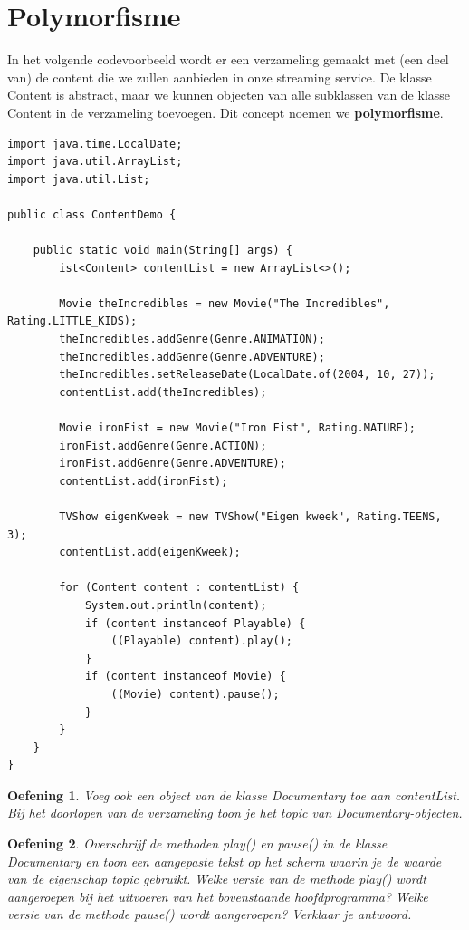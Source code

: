 \documentclass{tstextbook}
\newtheorem{envoefening}{Oefening}[chapter]
\newenvironment{oefening}
               {\begin{boxexercise}\begin{envoefening}}
               {\end{envoefening}\end{boxexercise}}
\begin{document}
\section{Polymorfisme}

In het volgende codevoorbeeld wordt er een verzameling gemaakt met (een deel van) de content die we zullen aanbieden in onze streaming service. De klasse Content is abstract, maar we kunnen objecten van alle subklassen van de klasse Content in de verzameling toevoegen. Dit concept noemen we \textbf{polymorfisme}. 


\begin{lstlisting}
import java.time.LocalDate;
import java.util.ArrayList;
import java.util.List;

public class ContentDemo {

	public static void main(String[] args) {
		ist<Content> contentList = new ArrayList<>();

		Movie theIncredibles = new Movie("The Incredibles", Rating.LITTLE_KIDS);
		theIncredibles.addGenre(Genre.ANIMATION);
		theIncredibles.addGenre(Genre.ADVENTURE);
		theIncredibles.setReleaseDate(LocalDate.of(2004, 10, 27));
		contentList.add(theIncredibles);

		Movie ironFist = new Movie("Iron Fist", Rating.MATURE);
		ironFist.addGenre(Genre.ACTION);
		ironFist.addGenre(Genre.ADVENTURE);
		contentList.add(ironFist);

		TVShow eigenKweek = new TVShow("Eigen kweek", Rating.TEENS, 3);
		contentList.add(eigenKweek);

		for (Content content : contentList) {
			System.out.println(content);
			if (content instanceof Playable) {
				((Playable) content).play();
			}
			if (content instanceof Movie) {
				((Movie) content).pause();
			}
		}
	}
}
\end{lstlisting}

\begin{oefening}
Voeg ook een object van de klasse Documentary toe aan contentList. Bij het doorlopen van de verzameling toon je het topic van Documentary-objecten.
\end{oefening}

\begin{oefening}
Overschrijf de methoden play() en pause() in de klasse Documentary en toon een aangepaste tekst op het scherm waarin je de waarde van de eigenschap topic gebruikt. Welke versie van de methode play() wordt aangeroepen bij het uitvoeren van het bovenstaande hoofdprogramma? Welke versie van de methode pause() wordt aangeroepen? Verklaar je antwoord.
\end{oefening}
\end{document}
